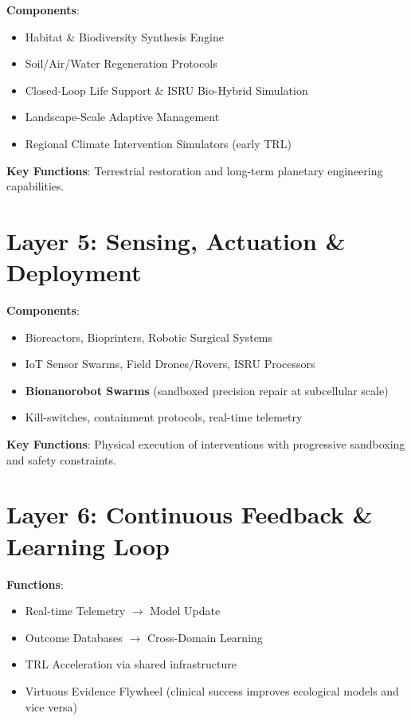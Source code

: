 \documentclass[11pt,a4paper]{report}
\begin{document}
\textbf{Components}:
\begin{itemize}
    \item Habitat \& Biodiversity Synthesis Engine
    \item Soil/Air/Water Regeneration Protocols
    \item Closed-Loop Life Support \& ISRU Bio-Hybrid Simulation
    \item Landscape-Scale Adaptive Management
    \item Regional Climate Intervention Simulators (early TRL)
\end{itemize}

\textbf{Key Functions}: Terrestrial restoration and long-term planetary engineering capabilities.

\section{Layer 5: Sensing, Actuation \& Deployment}

\textbf{Components}:
\begin{itemize}
    \item Bioreactors, Bioprinters, Robotic Surgical Systems
    \item IoT Sensor Swarms, Field Drones/Rovers, ISRU Processors
    \item \textbf{Bionanorobot Swarms} (sandboxed precision repair at subcellular scale)
    \item Kill-switches, containment protocols, real-time telemetry
\end{itemize}

\textbf{Key Functions}: Physical execution of interventions with progressive sandboxing and safety constraints.

\section{Layer 6: Continuous Feedback \& Learning Loop}

\textbf{Functions}:
\begin{itemize}
    \item Real-time Telemetry $\to$ Model Update
    \item Outcome Databases $\to$ Cross-Domain Learning
    \item TRL Acceleration via shared infrastructure
    \item Virtuous Evidence Flywheel (clinical success improves ecological models and vice versa)
\end{itemize}
\end{document}
